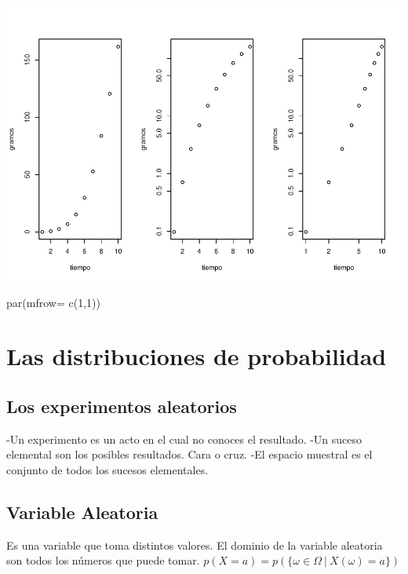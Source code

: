 \documentclass[
]{article}
\newenvironment{Shaded}{\begin{snugshade}}{\end{snugshade}}
\newcommand{\AttributeTok}[1]{\textcolor[rgb]{0.77,0.63,0.00}{#1}}
\newcommand{\DecValTok}[1]{\textcolor[rgb]{0.00,0.00,0.81}{#1}}
\newcommand{\FunctionTok}[1]{\textcolor[rgb]{0.00,0.00,0.00}{#1}}
\newcommand{\NormalTok}[1]{#1}
\begin{document}
\includegraphics{Teoria4_files/figure-latex/unnamed-chunk-1-1.pdf}

\begin{Shaded}
\begin{Highlighting}[]
\FunctionTok{par}\NormalTok{(}\AttributeTok{mfrow=} \FunctionTok{c}\NormalTok{(}\DecValTok{1}\NormalTok{,}\DecValTok{1}\NormalTok{))}
\end{Highlighting}
\end{Shaded}

\hypertarget{las-distribuciones-de-probabilidad}{%
\section{Las distribuciones de
probabilidad}\label{las-distribuciones-de-probabilidad}}

\hypertarget{los-experimentos-aleatorios}{%
\subsection{Los experimentos
aleatorios}\label{los-experimentos-aleatorios}}

-Un experimento es un acto en el cual no conoces el resultado. -Un
suceso elemental son los posibles resultados. Cara o cruz. -El espacio
muestral es el conjunto de todos los sucesos elementales.

\hypertarget{variable-aleatoria}{%
\subsection{Variable Aleatoria}\label{variable-aleatoria}}

Es una variable que toma distintos valores. El dominio de la variable
aleatoria son todos los números que puede tomar.
\(p(X=a) = p(\{\omega\in\Omega \ |\  X(\omega) = a\})\)
\end{document}

